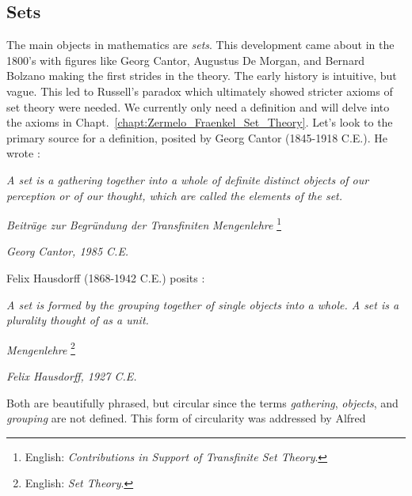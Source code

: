     \subsection{Sets}
        The main objects in mathematics are \textit{sets}. This development came
        about in the 1800's with figures like Georg Cantor,
        Augustus De Morgan, and Bernard
        Bolzano making the first strides in the theory.
        The early history is intuitive, but vague. This led to Russell's
        paradox which
        ultimately showed stricter axioms of set theory were needed. We
        currently only need a definition and will delve into the axioms in
        Chapt.~\ref{chapt:Zermelo_Fraenkel_Set_Theory}. Let's look to the
        primary source for a definition, posited by Georg Cantor
        (1845-1918 C.E.). He wrote \cite{Cantor1895}:
        \begin{center}
            \textit{A set is a gathering together into a whole of definite}
            \textit{distinct objects of our perception or of our thought, which}
            \textit{are called the elements of the set.}
            \par\hfill
            \textit{Beitr\"{a}ge zur Begr\"{u}ndung der Transfiniten}
            \textit{Mengenlehre}%
            \footnote{%
                English:
                \textit{Contributions in Support of Transfinite Set Theory}.%
            }
            \par\hfill
            \textit{Georg Cantor, 1985 C.E.}
        \end{center}
        Felix Hausdorff (1868-1942 C.E.) posits
        \cite[p.~11]{HausdorffSetTheory}:
        \begin{center}
            \textit{A set is formed by the grouping together of single objects}
            \textit{into a whole. A set is a plurality thought of as a unit.}
            \par\hfill
            \textit{Mengenlehre}%
            \footnote{%
                English:
                \textit{Set Theory}.%
            }
            \par\hfill
            \textit{Felix Hausdorff, 1927 C.E.}
        \end{center}
        Both are beautifully phrased, but circular since the terms
        \textit{gathering}, \textit{objects}, and \textit{grouping} are not
        defined. This form of circularity was addressed by Alfred

